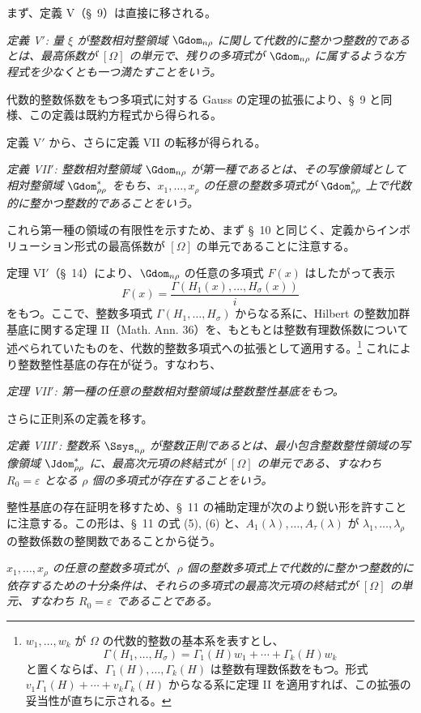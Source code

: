 \documentclass[11pt]{article}
\newcommand{\eps}{\varepsilon}
\begin{document}
まず、定義 V（\S\ 9）は直接に移される。

\emph{定義 V$'$: 量 $\xi$ が整数相対整領域 $\Gdom_{n\rho}$ に関して代数的に整かつ整数的であるとは、最高係数が $[\Omega]$ の単元で、残りの多項式が $\Gdom_{n\rho}$ に属するような方程式を少なくとも一つ満たすことをいう。}

代数的整数係数をもつ多項式に対する Gauss の定理の拡張により、\S\ 9 と同様、この定義は既約方程式から得られる。

定義 V$'$ から、さらに定義 VII の転移が得られる。

\emph{定義 VII$'$: 整数相対整領域 $\Gdom_{n\rho}$ が第一種であるとは、その写像領域として相対整領域 $\Gdom^*_{\rho\rho}$ をもち、$x_1,\ldots,x_\rho$ の任意の整数多項式が $\Gdom^*_{\rho\rho}$ 上で代数的に整かつ整数的であることをいう。}

これら第一種の領域の有限性を示すため、まず \S\ 10 と同じく、定義からインボリューション形式の最高係数が $[\Omega]$ の単元であることに注意する。

定理 VI$'$（\S\ 14）により、$\Gdom_{n\rho}$ の任意の多項式 $F(x)$ はしたがって表示
\[
  F(x)=\frac{\Gamma(H_1(x),\ldots,H_\sigma(x))}{i}
\]
をもつ。ここで、整数多項式 $\Gamma(H_1,\ldots,H_\sigma)$ からなる系に、Hilbert の整数加群基底に関する定理 II（Math. Ann. 36）を、もともとは整数有理数係数について述べられていたものを、代数的整数多項式への拡張として適用する。\footnote{$w_1,\ldots,w_k$ が $\Omega$ の代数的整数の基本系を表すとし、
\[
  \Gamma(H_1,\ldots,H_\sigma)=\Gamma_1(H)w_1+\cdots+\Gamma_k(H)w_k
\]
と置くならば、$\Gamma_1(H),\ldots,\Gamma_k(H)$ は整数有理数係数をもつ。形式 $v_1\Gamma_1(H)+\cdots+v_k\Gamma_k(H)$ からなる系に定理 II を適用すれば、この拡張の妥当性が直ちに示される。} これにより整数整性基底の存在が従う。すなわち、

\emph{定理 VII$'$: 第一種の任意の整数相対整領域は整数整性基底をもつ。}

さらに正則系の定義を移す。

\emph{定義 VIII$'$: 整数系 $\Ssys_{n\rho}$ が整数正則であるとは、最小包含整数整性領域の写像領域 $\Jdom^*_{\rho\rho}$ に、最高次元項の終結式が $[\Omega]$ の単元である、すなわち $R_0=\eps$ となる $\rho$ 個の多項式が存在することをいう。}

整性基底の存在証明を移すため、\S\ 11 の補助定理が次のより鋭い形を許すことに注意する。この形は、\S\ 11 の式 (5), (6) と、$A_1(\lambda),\ldots,A_\tau(\lambda)$ が $\lambda_1,\ldots,\lambda_\rho$ の整数係数の整関数であることから従う。

\emph{$x_1,\ldots,x_\rho$ の任意の整数多項式が、$\rho$ 個の整数多項式上で代数的に整かつ整数的に依存するための十分条件は、それらの多項式の最高次元項の終結式が $[\Omega]$ の単元、すなわち $R_0=\eps$ であることである。}
\end{document}
